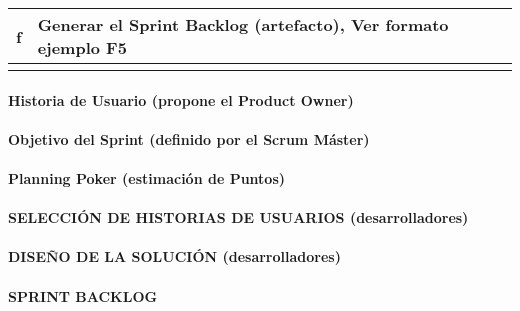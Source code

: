 \begin{doublespace}
\begin{longtable}{|c|p{15cm}|}
\hline
\rowcolor{lightblue} f & Generar el Sprint Backlog (artefacto), Ver formato ejemplo F5 \\
\hline
\rowcolor{bleudefrance} \multicolumn{2}{c|}{} \\
\hline

\end{longtable}

\clearpage  %

\paragraph{\Large\textbf {Historia de Usuario (propone el Product Owner)}}


\clearpage  %
\paragraph{\Large\textbf {Objetivo del Sprint (definido por el Scrum Máster)}}


\paragraph{\Large\textbf {Planning Poker (estimación de Puntos)}}


\clearpage  %
\paragraph{\large\textbf {SELECCIÓN DE HISTORIAS DE USUARIOS (desarrolladores)}}


\clearpage  %
\paragraph{\Large\textbf {DISEÑO DE LA SOLUCIÓN (desarrolladores)}}


\clearpage %
\paragraph{\Large\textbf {SPRINT BACKLOG}}






\end{doublespace}
